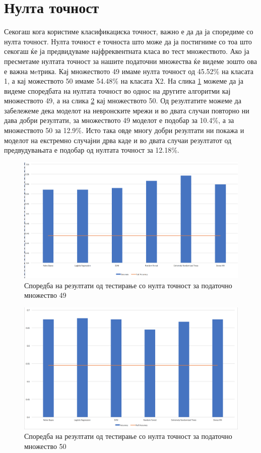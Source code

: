 \section{Нулта точност}
Секогаш кога користиме класификациска точност, важно е да да ја споредиме со нулта точност. Нулта точност е точноста што може да ја постигниме со тоа што секогаш ќе ја предвидуваме најфреквентната класа во тест множеството. Ако ја пресметаме нултата точност за нашите податочни множества ќе видеме зошто ова е важна мeтрика. Кај множеството 49 имаме нулта точност од 45.52\% на класата 1, а кај можеството 50 имаме 54.48\% на класата Х2. На слика \ref{fig:null_acc_49} можеме да ја видеме споредбата на нултата точност во однос на другите алгоритми кај множеството 49, а на слика \ref{fig:null_acc_50} кај множеството 50. Од резултатите можеме да забележеме дека моделот на невронските мрежи и во двата случаи повторно ни дава добри резултати, за множеството 49 моделот е подобар за 10.4\%, а за множеството 50 за 12.9\%. Исто така овде многу добри резултати ни покажа и моделот на екстремно случајни дрва каде и во двата случаи резултатот од предвудувањата е подобар од нултата точност за 12.18\%.
\begin{figure}[H]
\centering
\includegraphics[scale=0.34]{images/null_accuracy_49.png}
\caption{Споредба на резултати од тестирање со нулта точност за податочно множество 49}
\label{fig:null_acc_49}
\centering
\end{figure}

\begin{figure}[H]
\centering
\includegraphics[scale=0.34]{images/null_accuracy_50.png}
\caption{Споредба на резултати од тестирање со нулта точност за податочно множество 50}
\label{fig:null_acc_50}
\centering
\end{figure}

